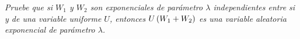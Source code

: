 \emph{
	Pruebe que si $W_1$ y $W_2$  son  exponenciales de par\'ametro 
	$\lambda$  independientes entre si y de una variable uniforme $U$, 
	entonces $U\left( W_1+W_2\right) $ es una variable aleatoria exponencial 
	de par\'ametro $\lambda$.
}

\afterstatement\pn